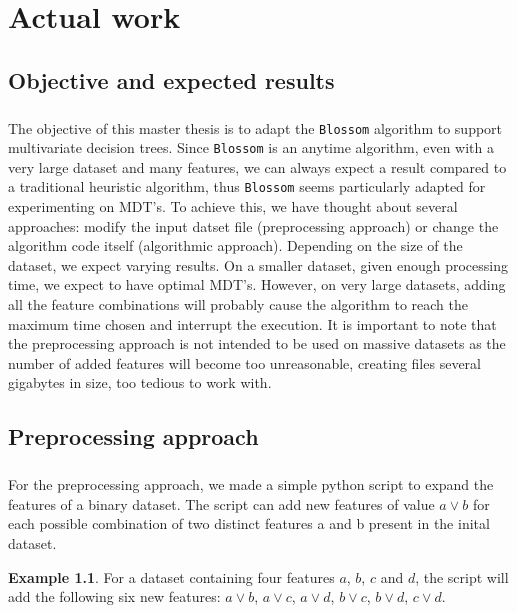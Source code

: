 \documentclass[12pt]{report}
\theoremstyle{definition}
\newtheorem*{example}{Example}
\theoremstyle{definition}
\theoremstyle{definition}
\begin{document}
\chapter{Actual work}
\section{Objective and expected results} %
\paragraph{} The objective of this master thesis is to adapt the \texttt{Blossom} algorithm to support multivariate
decision trees. Since \texttt{Blossom} is an anytime algorithm, even with a very large dataset and many features,
we can always expect a result compared to a traditional heuristic algorithm, thus \texttt{Blossom} seems particularly
adapted for experimenting on MDT's. To achieve this, we have thought about several approaches: modify the
input datset file (preprocessing approach) or change the algorithm code itself (algorithmic approach).
Depending on the size of the dataset, we expect varying results. On a smaller dataset, given enough
processing time, we expect to have optimal MDT's. However, on very large datasets, adding all the feature
combinations will probably cause the algorithm to reach the maximum time chosen and interrupt the execution.
It is important to note that the preprocessing approach is not intended to be used on massive datasets as
the number of added features will become too unreasonable, creating files several gigabytes in size,
too tedious to work with. 


\section{Preprocessing approach}
\paragraph{} For the preprocessing approach, we made a simple python script to expand the features of a binary
dataset. The script can add new features of value $a \lor b$ for each possible combination of two distinct
features a and b present in the inital dataset.

\begin{example}
    For a dataset containing four features $a$, $b$, $c$ and $d$, the script will add the following six new
    features: $a \lor b$, $a \lor c$, $a \lor d$, $b \lor c$, $b \lor d$, $c \lor d$.
\end{example}
\end{document}

